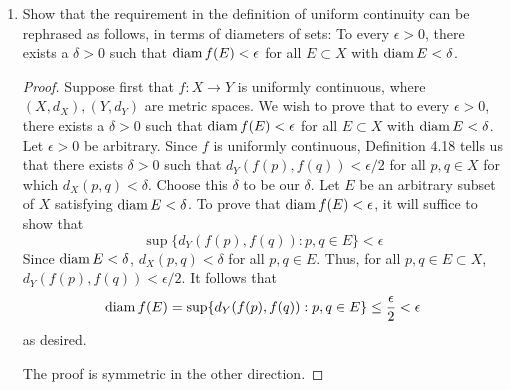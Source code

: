 \documentclass[../psets.tex]{subfiles}
\begin{document}
\begin{enumerate}[label={\textbf{\arabic*.}}]
    \begin{proof}
        Since $E$ is dense in $\bar{E}$ and $f$ is a uniformly continuous real function on $E$, Exercise 4.13 asserts that $f$ has a continuous extension $g$ from $E$ to $\bar{E}$. Since $E\subset\R^1$ is bounded, $\bar{E}\subset\R^1$ is closed and bounded, and hence compact by the Heine-Borel theorem. This combined with the fact that $g$ is continuous implies by Theorem 4.14 that $g(\bar{E})$ is compact. Thus, $g(\bar{E})$ must be closed and bounded by the Heine-Borel theorem, so $f(E)\subset g(\bar{E})$ must be bounded. It follows trivially that $f$ is bounded.\par
        Let $E=\R^1$ and $f:E\to\R$ be defined by $f(x)=x$ for all $x\in E$. Then $f$ is a real uniformly continuous function on $E$ unbounded for which $f(E)=E$ is naturally unbounded.
    \end{proof}
    \item Show that the requirement in the definition of uniform continuity can be rephrased as follows, in terms of diameters of sets: To every $\epsilon>0$, there exists a $\delta>0$ such that $\operatorname{diam} f(E)<\epsilon$ for all $E\subset X$ with $\operatorname{diam} E<\delta$.
    \begin{proof}
        Suppose first that $f:X\to Y$ is uniformly continuous, where $(X,d_X),(Y,d_Y)$ are metric spaces. We wish to prove that to every $\epsilon>0$, there exists a $\delta>0$ such that $\operatorname{diam} f(E)<\epsilon$ for all $E\subset X$ with $\operatorname{diam} E<\delta$. Let $\epsilon>0$ be arbitrary. Since $f$ is uniformly continuous, Definition 4.18 tells us that there exists $\delta>0$ such that $d_Y(f(p),f(q))<\epsilon/2$ for all $p,q\in X$ for which $d_X(p,q)<\delta$. Choose this $\delta$ to be our $\delta$. Let $E$ be an arbitrary subset of $X$ satisfying $\operatorname{diam} E<\delta$. To prove that $\operatorname{diam} f(E)<\epsilon$, it will suffice to show that
        \begin{equation*}
            \sup\{d_Y(f(p),f(q)):p,q\in E\} < \epsilon
        \end{equation*}
        Since $\operatorname{diam} E<\delta$, $d_X(p,q)<\delta$ for all $p,q\in E$. Thus, for all $p,q\in E\subset X$, $d_Y(f(p),f(q))<\epsilon/2$. It follows that
        \begin{equation*}
            \operatorname{diam} f(E) = \sup\{d_Y(f(p),f(q)):p,q\in E\} \leq \frac{\epsilon}{2} < \epsilon
        \end{equation*}
        as desired.\par
        The proof is symmetric in the other direction.
    \end{proof}

\end{enumerate}
\end{document}
